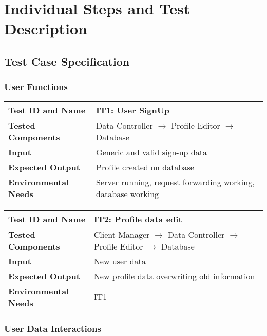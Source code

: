 \section{Individual Steps and Test Description}
\subsection{Test Case Specification}

\subsubsection{User Functions}

\begin{tabular}{l p{}}
    \hline
    \textbf{Test ID and Name} & \textbf{IT1: User SignUp}\\
    \hline
    \textbf{Tested Components} & Data Controller $\rightarrow$ Profile Editor $\rightarrow$ Database\\
    \hline
    \textbf{Input} & Generic and valid sign-up data\\
    \hline
    \textbf{Expected Output} & Profile created on database\\
    \hline
    \textbf{Environmental Needs} & Server running, request forwarding working, database working\\
    \hline
\end{tabular}

\vspace{2em}

\noindent\begin{tabular}{l p{}}
    \hline
    \textbf{Test ID and Name} & \textbf{IT2: Profile data edit}\\
    \hline
    \textbf{Tested Components} & Client Manager $\rightarrow$ Data Controller $\rightarrow$ Profile Editor $\rightarrow$ Database\\
    \hline
    \textbf{Input} & New user data\\
    \hline
    \textbf{Expected Output} & New profile data overwriting old information\\
    \hline
    \textbf{Environmental Needs} & IT1\\
    \hline
\end{tabular}

\subsubsection{User Data Interactions}


